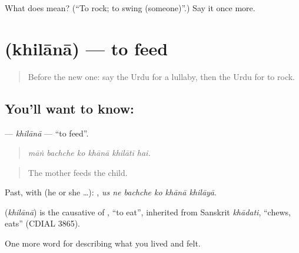 \begin{tcolorbox}[breakable,colback=teal!4,colframe=teal!35!black,title={Before you move on}]
What does  mean? (\textquotedblleft{}To rock; to swing (someone)\textquotedblright{}.) Say it once more.
\end{tcolorbox}
\section[\texorpdfstring{\ur{کھلانا} (khilānā)}{کھلانا (khilānā)}]{ (khilānā) — to feed}

\label{lesson:UR-C484-khilana}



\begin{quote}
Before the new one: say the Urdu for a lullaby, then the Urdu for to rock.
\end{quote}

\subsection*{You'll want to know: }
\textbf{} — \emph{khilānā} — \textquotedblleft{}to feed\textquotedblright{}.

\begin{quote}
     
\end{quote}

\begin{quote}
\emph{māṅ bachche ko khānā khilātī hai.}
\end{quote}

\begin{quote}
The mother feeds the child.
\end{quote}

Past, with  (he or she …):      , \emph{us ne bachche ko khānā khilāyā}.

\begin{cousinweb}
\textbf{} (\emph{khilānā}) is the causative of \textbf{}, \textquotedblleft{}to eat\textquotedblright{}, inherited from Sanskrit \emph{khādati}, \textquotedblleft{}chews, eats\textquotedblright{} (CDIAL 3865).
\end{cousinweb}

\begin{grammarlens}[title={What you've built}]
One more word for describing what you lived and felt.
\end{grammarlens}

